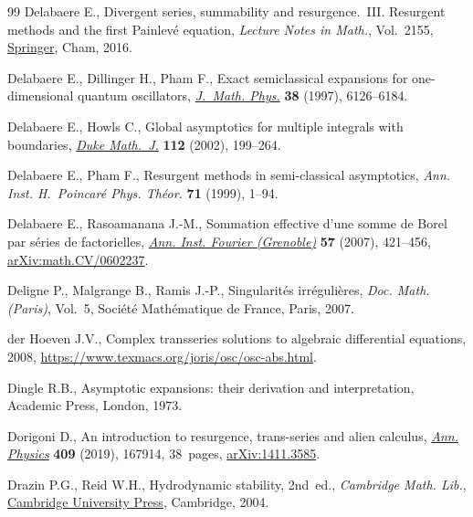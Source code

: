 \begin{thebibliography}{99}
Delabaere E., Divergent series, summability and resurgence.~{III}. {R}esurgent methods and the first Painlev\'e equation,
 \textit{Lecture Notes in Math.}, Vol.~2155,
 \href{https://doi.org/10.1007/978-3-319-29000-3}{Springer}, Cham, 2016.

Delabaere E., Dillinger H., Pham F., Exact semiclassical expansions for
 one-dimensional quantum oscillators,
 \href{https://doi.org/10.1063/1.532206}{\textit{J.~Math. Phys.}} \textbf{38}
 (1997), 6126--6184.

Delabaere E., Howls C., Global asymptotics for multiple integrals with
 boundaries, \href{https://doi.org/10.1215/S0012-9074-02-11221-6}{\textit{Duke
 Math.~J.}} \textbf{112} (2002), 199--264.

Delabaere E., Pham F., Resurgent methods in semi-classical asymptotics,
 \textit{Ann. Inst. H.~Poincar\'e Phys. Th\'eor.} \textbf{71} (1999), 1--94.

Delabaere E., Rasoamanana J.-M., Sommation effective d'une somme de {B}orel par
 s\'eries de factorielles,
 \href{https://doi.org/10.5802/aif.2263}{\textit{Ann. Inst. Fourier
 (Grenoble)}} \textbf{57} (2007), 421--456,
 \href{http://arxiv.org/abs/math.CV/0602237}{arXiv:math.CV/0602237}.

Deligne P., Malgrange B., Ramis J.-P., Singularit\'es irr\'eguli\`eres,
 \textit{Doc. Math. (Paris)}, Vol.~5, Soci\'et\'e Math\'ematique de France,
 Paris, 2007.

der Hoeven J.V., Complex transseries solutions to algebraic differential
 equations, 2008, \url{https://www.texmacs.org/joris/osc/osc-abs.html}.

Dingle R.B., Asymptotic expansions: their derivation and interpretation,
Academic Press, London, 1973.

Dorigoni D., An introduction to resurgence, trans-series and alien calculus,
 \href{https://doi.org/10.1016/j.aop.2019.167914}{\textit{Ann. Physics}}
 \textbf{409} (2019), 167914, 38~pages,
 \href{http://arxiv.org/abs/1411.3585}{arXiv:1411.3585}.

Drazin P.G., Reid W.H., Hydrodynamic stability, 2nd~ed., \textit{Cambridge Math. Lib.},
 \href{https://doi.org/10.1017/CBO9780511616938}{Cambridge University Press},
 Cambridge, 2004.


\end{thebibliography}
